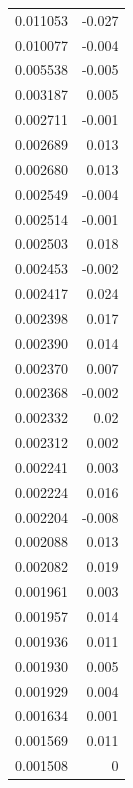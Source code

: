 \documentclass[number, sort&compress, review, 12pt]{elsarticle}
\begin{document}
\begin{longtable}{rr}
0.011053 & -0.027\\
0.010077 & -0.004\\
0.005538 & -0.005\\
0.003187 & 0.005\\
0.002711 & -0.001\\
0.002689 & 0.013\\
0.002680 & 0.013\\
0.002549 & -0.004\\
0.002514 & -0.001\\
0.002503 & 0.018\\
0.002453 & -0.002\\
0.002417 & 0.024\\
0.002398 & 0.017\\
0.002390 & 0.014\\
0.002370 & 0.007\\
0.002368 & -0.002\\
0.002332 & 0.02\\
0.002312 & 0.002\\
0.002241 & 0.003\\
0.002224 & 0.016\\
0.002204 & -0.008\\
0.002088 & 0.013\\
0.002082 & 0.019\\
0.001961 & 0.003\\
0.001957 & 0.014\\
0.001936 & 0.011\\
0.001930 & 0.005\\
0.001929 & 0.004\\
0.001634 & 0.001\\
0.001569 & 0.011\\
0.001508 & 0\\
\end{longtable}
\end{document}
